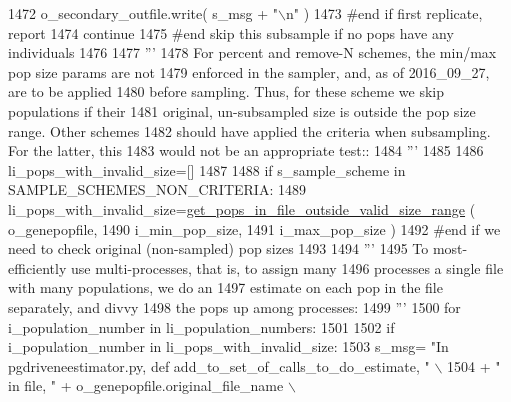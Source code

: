\begin{DoxyCode}
1472                 o\_secondary\_outfile.write( s\_msg + \textcolor{stringliteral}{"\(\backslash\)n"} )
1473             \textcolor{comment}{#end if first replicate, report}
1474             \textcolor{keywordflow}{continue}
1475         \textcolor{comment}{#end skip this subsample if no pops have any individuals}
1476 
1477         \textcolor{stringliteral}{'''}
1478 \textcolor{stringliteral}{        For percent and remove-N schemes, the min/max pop size params are not }
1479 \textcolor{stringliteral}{        enforced in the sampler, and, as of 2016\_09\_27, are to be applied}
1480 \textcolor{stringliteral}{        before sampling.  Thus, for these scheme we skip populations if their }
1481 \textcolor{stringliteral}{        original, un-subsampled size is outside the pop size range.  Other schemes}
1482 \textcolor{stringliteral}{        should have applied the criteria when subsampling.  For the latter, this}
1483 \textcolor{stringliteral}{        would not be an appropriate test::}
1484 \textcolor{stringliteral}{        '''}
1485 
1486         li\_pops\_with\_invalid\_size=[]
1487         
1488         \textcolor{keywordflow}{if} s\_sample\_scheme \textcolor{keywordflow}{in} SAMPLE\_SCHEMES\_NON\_CRITERIA:
1489             li\_pops\_with\_invalid\_size=\hyperlink{namespacenegui_1_1pgdriveneestimator_ab546af99f06d3ec795da61f806ffafa9}{get\_pops\_in\_file\_outside\_valid\_size\_range}
      ( o\_genepopfile, 
1490                                                                                 i\_min\_pop\_size,
1491                                                                                 i\_max\_pop\_size )
1492         \textcolor{comment}{#end if we need to check original (non-sampled) pop sizes}
1493 
1494         \textcolor{stringliteral}{'''}
1495 \textcolor{stringliteral}{        To most-efficiently use multi-processes, that is, to assign many}
1496 \textcolor{stringliteral}{        processes a single file with many populations, we do an}
1497 \textcolor{stringliteral}{        estimate on each pop in the file separately, and divvy}
1498 \textcolor{stringliteral}{        the pops up among processes:}
1499 \textcolor{stringliteral}{        '''}
1500         \textcolor{keywordflow}{for} i\_population\_number \textcolor{keywordflow}{in} li\_population\_numbers:
1501 
1502             \textcolor{keywordflow}{if} i\_population\_number \textcolor{keywordflow}{in} li\_pops\_with\_invalid\_size:
1503                 s\_msg= \textcolor{stringliteral}{"In pgdriveneestimator.py, def add\_to\_set\_of\_calls\_to\_do\_estimate, "} \(\backslash\)
1504                                 + \textcolor{stringliteral}{" in file, "} + o\_genepopfile.original\_file\_name \(\backslash\)

\end{DoxyCode}
